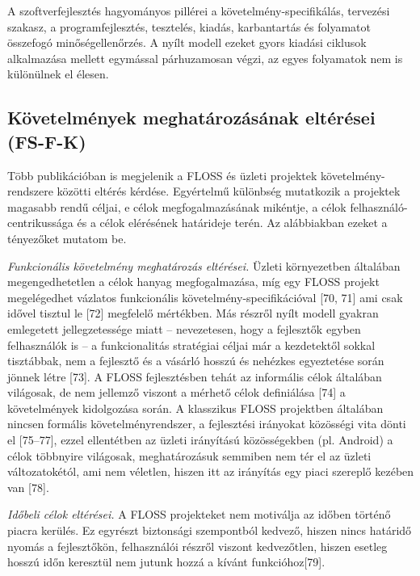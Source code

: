 \documentclass[12pt,magyar,a4paper,oneside]{scrreprt}
\begin{document}
A szoftverfejlesztés hagyományos pillérei a követelmény-specifikálás,
tervezési szakasz, a programfejlesztés, tesztelés, kiadás, karbantartás
és folyamatot összefogó minőségellenőrzés. A nyílt modell ezeket gyors
kiadási ciklusok alkalmazása mellett egymással párhuzamosan végzi, az
egyes folyamatok nem is különülnek el élesen.

\hypertarget{sec:FS-F-K}{%
\subsection{Követelmények meghatározásának eltérései
(FS-F-K)}\label{sec:FS-F-K}}

Több publikációban is megjelenik a FLOSS és üzleti projektek
követelmény-rendszere közötti eltérés kérdése. Egyértelmű különbség
mutatkozik a projektek magasabb rendű céljai, e célok megfogalmazásának
mikéntje, a célok felhasználó-centrikussága és a célok elérésének
határideje terén. Az alábbiakban ezeket a tényezőket mutatom be.

\emph{Funkcionális követelmény meghatározás eltérései.} Üzleti
környezetben általában megengedhetetlen a célok hanyag megfogalmazása,
míg egy FLOSS projekt megelégedhet vázlatos funkcionális
követelmény-specifikációval {[}70, 71{]} ami csak idővel tisztul le
{[}72{]} megfelelő mértékben. Más részről nyílt modell gyakran
emlegetett jellegzetessége miatt -- nevezetesen, hogy a fejlesztők
egyben felhasználók is -- a funkcionalitás stratégiai céljai már a
kezdetektől sokkal tisztábbak, nem a fejlesztő és a vásárló hosszú és
nehézkes egyeztetése során jönnek létre {[}73{]}. A FLOSS fejlesztésben
tehát az informális célok általában világosak, de nem jellemző viszont a
mérhető célok definiálása {[}74{]} a követelmények kidolgozása során. A
klasszikus FLOSS projektben általában nincsen formális
követelményrendszer, a fejlesztési irányokat közösségi vita dönti el
{[}75--77{]}, ezzel ellentétben az üzleti irányítású közösségekben (pl.
Android) a célok többnyire világosak, meghatározásuk semmiben nem tér el
az üzleti változatokétól, ami nem véletlen, hiszen itt az irányítás egy
piaci szereplő kezében van {[}78{]}.

\emph{Időbeli célok eltérései.} A FLOSS projekteket nem motiválja az
időben történő piacra kerülés. Ez egyrészt biztonsági szempontból
kedvező, hiszen nincs határidő nyomás a fejlesztőkön, felhasználói
részről viszont kedvezőtlen, hiszen esetleg hosszú időn keresztül nem
jutunk hozzá a kívánt funkcióhoz{[}79{]}.
\end{document}
